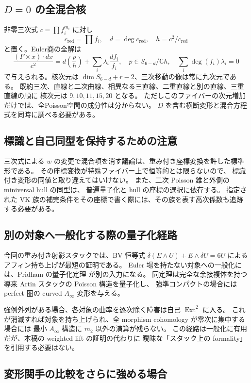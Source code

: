 \subsection{$D=0$ の全混合核}
非零三次式 $c=\prod f_i^{m_i}$ に対し
\[
 c_{\mathrm{red}}=\prod f_i,\quad d=\deg c_{\mathrm{red}},\quad
 h=c^2/c_{\mathrm{red}}
\]
と置く。Euler商の全解は
\[
 \frac{(F\times x)\cdot dx}{c^2}
 =d\left(\frac ph\right)+\sum_i\lambda_i\frac{df_i}{f_i},
 \quad p\in S_{6-d}/\mathbb Ch,\quad
 \sum_i\deg(f_i)\lambda_i=0
\]
で与えられる。核次元は $\dim S_{6-d}+r-2$、三次移動の像は常に九次元である。
既約三次、直線と二次曲線、相異なる三直線、二重直線と別の直線、三重直線の順に
核次元は $9,10,11,15,20$ となる。
ただしこのファイバーの次元増加だけでは、全Poisson空間の成分性は分からない。
$D$ を含む横断変形と混合方程式を同時に調べる必要がある。

\subsection{標識と自己同型を保持するための注意}

三次式による $w$ の変更で混合項を消す議論は、重み付き座標変換を許した標準形である。
その座標変換が特殊ファイバー上で恒等的とは限らないので、
標識付き変形の同値と取り違えてはいけない。
また、二次 Poisson 錐と外側の miniversal hull の同型は、
普遍量子化と hull の座標の選択に依存する。
指定された VK 族の補完条件をその座標で書く際には、その族を表す高次係数も追跡する必要がある。

\subsection{別の対象へ一般化する際の量子化経路}

今回の重み付き射影スタックでは、BV 恒等式
$\delta(E\wedge U)+E\wedge\delta U=6U$ によるアフィン持ち上げが最短の証明である。
Euler 場を持たない対象への一般化には、Pridham の量子化定理
\cite[Corollary~3.38]{Pridham2025} が別の入力になる。
同定理は完全な余接複体を持つ導来 Artin スタックの Poisson 構造を量子化し、
強準コンパクトの場合には perfect 圏の curved $A_\infty$ 変形を与える。

強例外列がある場合、各対象の曲率を逐次除く障害は自己 $\operatorname{Ext}^2$ に入る。
これが消滅すれば対象を持ち上げられ、全 morphism cohomology が零次に集中する場合には
最小 $A_\infty$ 構造に $m_2$ 以外の演算が残らない。
この経路は一般化に有用だが、本稿の weighted lift の証明の代わりに
曖昧な「スタック上の formality」を引用する必要はない。

\subsection{変形関手の比較をさらに強める場合}


